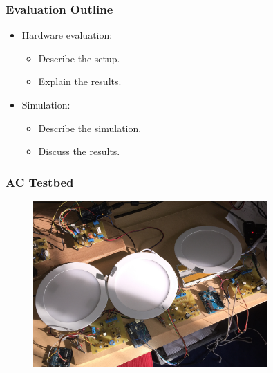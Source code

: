 \documentclass{beamer}
\begin{document}
	\begin{frame}\frametitle{Evaluation Outline}
		

		\begin{itemize}

			\item Hardware evaluation:
			\begin{itemize}

				\item Describe the setup.
				\item Explain the results.
			
			\end{itemize}

			\item Simulation:
			\begin{itemize}
				\item Describe the simulation.
				\item Discuss the results.
			\end{itemize}




		\end{itemize}
	\end{frame}


	\begin{frame}\frametitle{AC Testbed}
		
		\begin{figure}
			\centering
			\includegraphics[width=0.8\textwidth]{IMG_1755.JPG}
		\end{figure}

	\end{frame}
\end{document}

